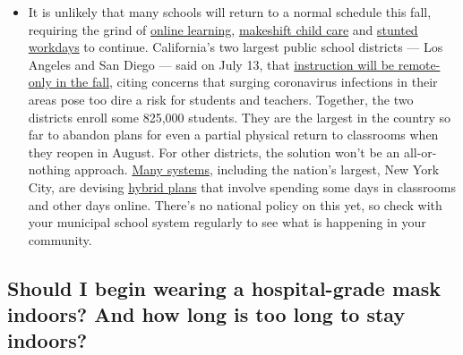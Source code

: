\begin{itemize}
  \begin{itemize}
  \tightlist
  \item
    It is unlikely that many schools will return to a normal schedule
    this fall, requiring the grind of
    \href{https://www.nytimes.com/2020/06/05/us/coronavirus-education-lost-learning.html?action=click\&pgtype=Article\&state=default\&region=MAIN_CONTENT_3\&context=storylines_faq}{online
    learning},
    \href{https://www.nytimes.com/2020/05/29/us/coronavirus-child-care-centers.html?action=click\&pgtype=Article\&state=default\&region=MAIN_CONTENT_3\&context=storylines_faq}{makeshift
    child care} and
    \href{https://www.nytimes.com/2020/06/03/business/economy/coronavirus-working-women.html?action=click\&pgtype=Article\&state=default\&region=MAIN_CONTENT_3\&context=storylines_faq}{stunted
    workdays} to continue. California's two largest public school
    districts --- Los Angeles and San Diego --- said on July 13, that
    \href{https://www.nytimes.com/2020/07/13/us/lausd-san-diego-school-reopening.html?action=click\&pgtype=Article\&state=default\&region=MAIN_CONTENT_3\&context=storylines_faq}{instruction
    will be remote-only in the fall}, citing concerns that surging
    coronavirus infections in their areas pose too dire a risk for
    students and teachers. Together, the two districts enroll some
    825,000 students. They are the largest in the country so far to
    abandon plans for even a partial physical return to classrooms when
    they reopen in August. For other districts, the solution won't be an
    all-or-nothing approach.
    \href{https://bioethics.jhu.edu/research-and-outreach/projects/eschool-initiative/school-policy-tracker/}{Many
    systems}, including the nation's largest, New York City, are
    devising
    \href{https://www.nytimes.com/2020/06/26/us/coronavirus-schools-reopen-fall.html?action=click\&pgtype=Article\&state=default\&region=MAIN_CONTENT_3\&context=storylines_faq}{hybrid
    plans} that involve spending some days in classrooms and other days
    online. There's no national policy on this yet, so check with your
    municipal school system regularly to see what is happening in your
    community.
  \end{itemize}
\end{itemize}

\hypertarget{should-i-begin-wearing-a-hospital-grade-mask-indoors-and-how-long-is-too-long-to-stay-indoors}{%
\subsection{Should I begin wearing a hospital-grade mask indoors? And
how long is too long to stay
indoors?}\label{should-i-begin-wearing-a-hospital-grade-mask-indoors-and-how-long-is-too-long-to-stay-indoors}}

